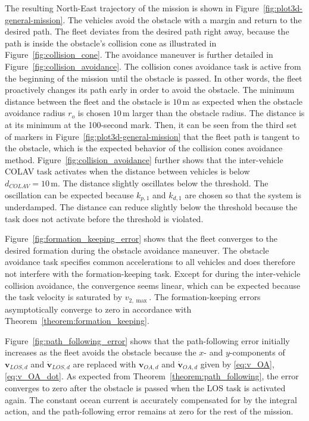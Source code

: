 The resulting North-East trajectory of the mission is shown in Figure~\ref{fig:plot3d-general-mission}. The vehicles avoid the obstacle with a margin and return to the desired path. The fleet deviates from the desired path right away, because the path is inside the obstacle's collision cone as illustrated in Figure~\ref{fig:collision_cone}. The avoidance maneuver is further detailed in Figure~\ref{fig:collision_avoidance}. The collision cones avoidance task is active from the beginning of the mission until the obstacle is passed. In other words, the fleet proactively changes its path early in order to avoid the obstacle. The minimum distance between the fleet and the obstacle is $10\, \mathrm{m}$ as expected when the obstacle avoidance radius $r_o$ is chosen $10 \, \mathrm{m}$ larger than the obstacle radius. The distance is at its minimum at the 100-second mark. Then, it can be seen from the third set of markers in Figure~\ref{fig:plot3d-general-mission} that the fleet path is tangent to the obstacle, which is the expected behavior of the collision cones avoidance method. Figure~\ref{fig:collision_avoidance} further shows that the inter-vehicle COLAV task activates when the distance between vehicles is below $d_{COLAV} = 10\, \mathrm{m}$. The distance slightly oscillates below the threshold. The oscillation can be expected because $k_{p,1}$ and $k_{d,1}$ are chosen so that the system is underdamped. The distance can reduce slightly below the threshold because the task does not activate before the threshold is violated. 



Figure~\ref{fig:formation_keeping_error} shows that the fleet converges to the desired formation during the obstacle avoidance maneuver. The obstacle avoidance task specifies common accelerations to all vehicles and does therefore not interfere with the formation-keeping task. Except for during the inter-vehicle collision avoidance, the convergence seems linear, which can be expected because the task velocity is saturated by $v_{2,\max}$. The formation-keeping errors asymptotically converge to zero in accordance with Theorem~\ref{theorem:formation_keeping}.

Figure~\ref{fig:path_following_error} shows that the path-following error initially increases as the fleet avoids the obstacle because the $x$- and $y$-components of $\mathbf{v}_{LOS,d}$ and $\dot{\mathbf{v}}_{LOS,d}$ are replaced with $\mathbf{v}_{OA,d}$ and $\dot{\mathbf{v}}_{OA,d}$ given by \eqref{eq:v_OA}, \eqref{eq:v_OA_dot}. As expected from Theorem~\ref{theorem:path_following}, the error converges to zero after the obstacle is passed when the LOS task is activated again. The constant ocean current is accurately compensated for by the integral action, and the path-following error remains at zero for the rest of the mission.

